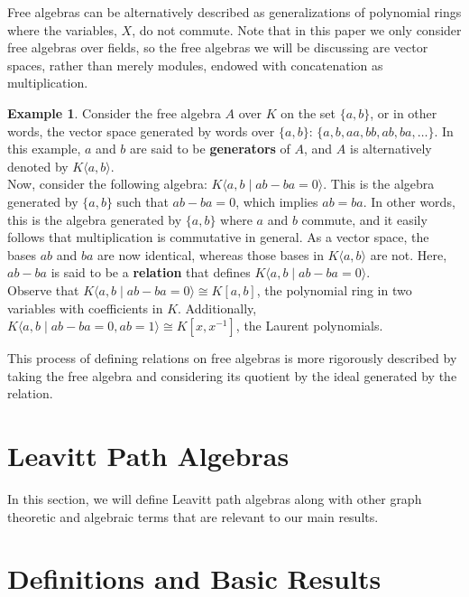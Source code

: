 \documentclass[12pt]{amsart}
\theoremstyle{plain} \numberwithin{equation}{section}
\theoremstyle{definition}
\newtheorem{example}[theorem]{Example}
\theoremstyle{definition}
\begin{document}
Free algebras can be alternatively described as generalizations of polynomial rings where the variables, $X$, do not commute. Note that in this paper we only consider free algebras over fields, so the free algebras we will be discussing are vector spaces, rather than merely modules, endowed with concatenation as multiplication.

\begin{example} 
    Consider the free algebra $A$ over $K$ on the set $\{a,b\}$, or in other words, the vector space generated by words over $\{a,b\}$: $\{a, b, aa, bb, ab, ba, \ldots \}$. In this example, $a$ and $b$ are said to be \textbf{generators} of $A$, and $A$ is alternatively denoted by $K\langle a,b\rangle$. \\
    Now, consider the following algebra: $K\langle a,b \mid ab - ba = 0\rangle$. This is the algebra generated by $\{a,b\}$ such that $ab - ba = 0$, which implies $ab = ba$. In other words, this is the algebra generated by $\{a,b\}$ where $a$ and $b$ commute, and it easily follows that multiplication is commutative in general. As a vector space, the bases $ab$ and $ba$ are now identical, whereas those bases in $K\langle a,b\rangle$ are not. Here, $ab-ba$ is said to be a \textbf{relation} that defines $K\langle a,b \mid ab - ba = 0\rangle$. \\

    Observe that $K\langle a,b \mid ab - ba = 0\rangle\cong K[a,b]$, the polynomial ring in two variables with coefficients in $K$. Additionally, $K\langle a,b \mid ab - ba = 0, ab = 1\rangle\cong K[x,x^{-1}]$, the Laurent polynomials. 
\end{example} 

    This process of defining relations on free algebras is more rigorously described by taking the free algebra and considering its quotient by the ideal generated by the relation. 

\section{\textbf{Leavitt Path Algebras}}

In this section, we will define Leavitt path algebras along with other graph theoretic and algebraic terms that are relevant to our main results. 

\section*{Definitions and Basic Results}
\end{document}
